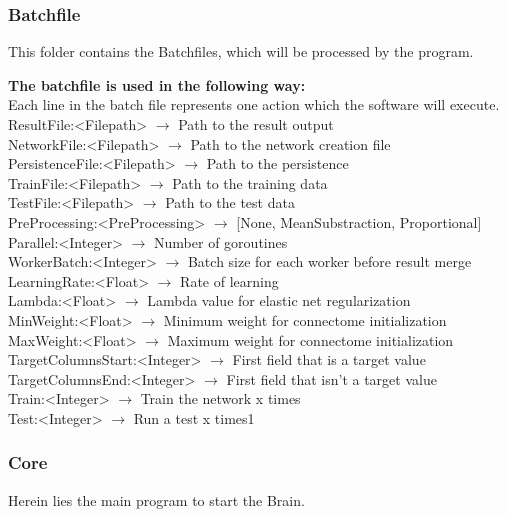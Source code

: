\documentclass[11pt]{article}
\begin{document}
\subsubsection{Batchfile}
This folder contains the Batchfiles, which will be processed by the program.

\textbf{The batchfile is used in the following way:}\\
Each line in the batch file represents one action which the software will execute.\\
ResultFile:<Filepath> $\rightarrow$ Path to the result output\\
NetworkFile:<Filepath> $\rightarrow$ Path to the network creation file\\
PersistenceFile:<Filepath> $\rightarrow$ Path to the persistence\\
TrainFile:<Filepath> $\rightarrow$ Path to the training data\\
TestFile:<Filepath> $\rightarrow$ Path to the test data\\
PreProcessing:<PreProcessing> $\rightarrow$ [None, MeanSubstraction, Proportional]\\
Parallel:<Integer> $\rightarrow$ Number of goroutines\\
WorkerBatch:<Integer> $\rightarrow$ Batch size for each worker before result merge\\
LearningRate:<Float> $\rightarrow$ Rate of learning\\
Lambda:<Float> $\rightarrow$ Lambda value for elastic net regularization\\
MinWeight:<Float> $\rightarrow$ Minimum weight for connectome initialization\\
MaxWeight:<Float> $\rightarrow$ Maximum weight for connectome initialization\\
TargetColumnsStart:<Integer> $\rightarrow$ First field that is a target value\\
TargetColumnsEnd:<Integer> $\rightarrow$ First field that isn't a target value\\
Train:<Integer> $\rightarrow$ Train the network x times\\
Test:<Integer> $\rightarrow$ Run a test x times1

\newpage
\subsubsection{Core}
Herein lies the main program to start the Brain.
\end{document}

